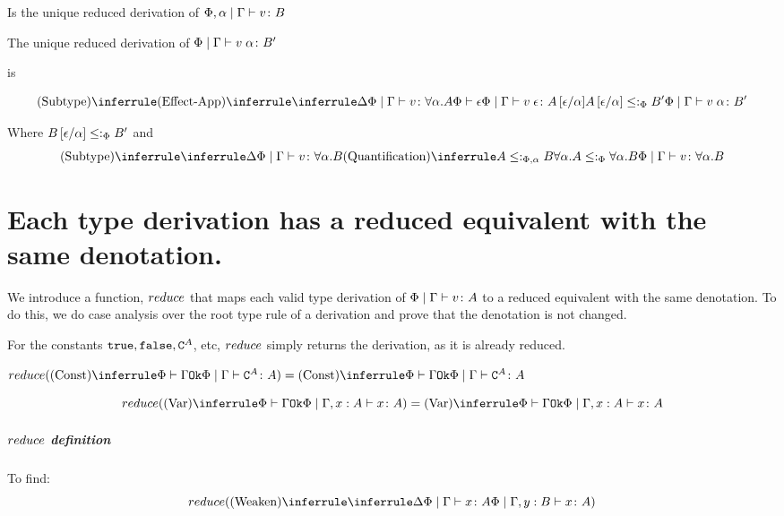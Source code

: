 {Is the unique reduced derivation of $\Phi,\alpha\mid\Gamma \vdash v \colon B$

The unique reduced derivation of $\Phi\mid\Gamma \vdash v\;\alpha \colon B'$

is 

\begin{equation}
    \ntreeruleII{Subtype}{
        \ntreeruleII{Effect-App}{
            \treeruleI{\D}{\gpetyperelation{v}{\all{\a}{A}}} }{ \wellformed{\P}{\e}
        }{\gpetyperelation{\eapp{v}{\e}}{A\ssub{\a}{\e}}}
         }{             
        A\ssub{\a}{\e}\subtypep B'
    }{\gpetyperelation{\eapp{v}{\a}}{B'}}
\end{equation}

Where $B\left[\epsilon / \alpha\right]\leq:_\Phi B'$
and
\begin{equation}
    \ntreeruleII{Subtype}{
        \treeruleI{\D}{\gpetyperelation{v}{\all{\a}{B}}} }{  \ntreeruleI{Quantification}{A\subtypepa B}{\all{\a}{A}\subtypep\all{\a}{B}}
    }{\gpetyperelation{v}{\all{\a}{B}}}
\end{equation}

\section{Each type derivation has a reduced equivalent with the same denotation.}
We introduce a function, $reduce$ that maps each valid type derivation of $\Phi\mid\Gamma \vdash v \colon A$ to a reduced equivalent with the same denotation. To do this, we do case analysis over the root type rule of a derivation and prove that the denotation is not changed.

        For the constants $\texttt{true}, \texttt{false}, \texttt{C}^{A}$, etc, $reduce$ simply returns the derivation, as it is already reduced.

        $\reduce(\ntreeruleI{Const}{\wellformedok{\P}{\G}}{\gpetyperelation{\const{A}}{A}}) = \ntreeruleI{Const}{\wellformedok{\P}{\G}}{\gpetyperelation{\const{A}}{A}}$


        \begin{equation}
            \reduce(\ntreeruleI{Var}{\wellformedok{\P}{\G}}{\etyperelation{\P}{\gax}{x}{A}}) =  \ntreeruleI{Var}{\wellformedok{\P}{\G}}{\etyperelation{\P}{\gax}{x}{A}}
        \end{equation}

        \subparagraph{$reduce$ definition}
        To find:
        \begin{equation}
            \reduce(\ntreeruleI{Weaken}{\treeruleI{\D}{\gpetyperelation{x}{A}}}{\etyperelation{\P}{\gby}{x}{A}})
        \end{equation}

}
